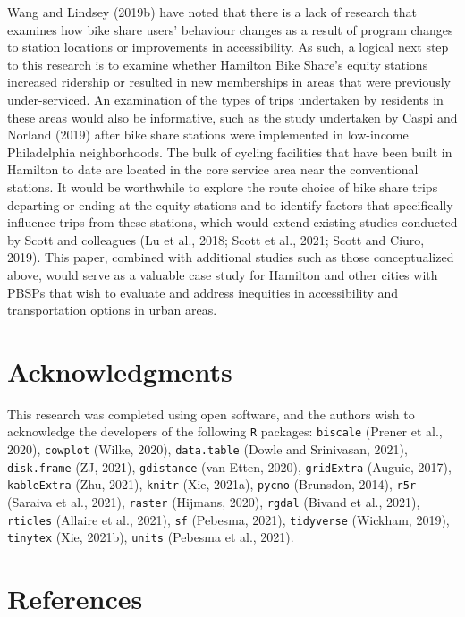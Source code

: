 \documentclass[]{elsarticle} %
\begin{document}
Wang and Lindsey (2019b) have noted that there is a lack of research
that examines how bike share users' behaviour changes as a result of
program changes to station locations or improvements in accessibility.
As such, a logical next step to this research is to examine whether
Hamilton Bike Share's equity stations increased ridership or resulted in
new memberships in areas that were previously under-serviced. An
examination of the types of trips undertaken by residents in these areas
would also be informative, such as the study undertaken by Caspi and
Norland (2019) after bike share stations were implemented in low-income
Philadelphia neighborhoods. The bulk of cycling facilities that have
been built in Hamilton to date are located in the core service area near
the conventional stations. It would be worthwhile to explore the route
choice of bike share trips departing or ending at the equity stations
and to identify factors that specifically influence trips from these
stations, which would extend existing studies conducted by Scott and
colleagues (Lu et al., 2018; Scott et al., 2021; Scott and Ciuro, 2019).
This paper, combined with additional studies such as those
conceptualized above, would serve as a valuable case study for Hamilton
and other cities with PBSPs that wish to evaluate and address inequities
in accessibility and transportation options in urban areas.

\hypertarget{acknowledgments}{%
\section{Acknowledgments}\label{acknowledgments}}

This research was completed using open software, and the authors wish to
acknowledge the developers of the following \texttt{R} packages:
\texttt{biscale} (Prener et al., 2020), \texttt{cowplot} (Wilke, 2020),
\texttt{data.table} (Dowle and Srinivasan, 2021), \texttt{disk.frame}
(ZJ, 2021), \texttt{gdistance} (van Etten, 2020), \texttt{gridExtra}
(Auguie, 2017), \texttt{kableExtra} (Zhu, 2021), \texttt{knitr} (Xie,
2021a), \texttt{pycno} (Brunsdon, 2014), \texttt{r5r} (Saraiva et al.,
2021), \texttt{raster} (Hijmans, 2020), \texttt{rgdal} (Bivand et al.,
2021), \texttt{rticles} (Allaire et al., 2021), \texttt{sf} (Pebesma,
2021), \texttt{tidyverse} (Wickham, 2019), \texttt{tinytex} (Xie,
2021b), \texttt{units} (Pebesma et al., 2021).

\hypertarget{references}{%
\section*{References}\label{references}}
\end{document}
